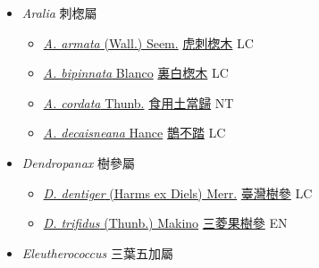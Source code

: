 
  \begin{itemize}
 \item[] \textit{Aralia} 刺楤屬
                    
  \begin{itemize}
        \item[] \href{http://www.theplantlist.org/tpl1.1/search?q=Aralia+armata}{\textit{A. armata} (Wall.) Seem.}   \href{\detokenize{http://taibnet.sinica.edu.tw/chi/taibnet_species_list.php?T2=虎刺楤木&T2_new_value=true&fr=y}}{虎刺楤木} LC
        \item[] \href{http://www.theplantlist.org/tpl1.1/search?q=Aralia+bipinnata}{\textit{A. bipinnata} Blanco}   \href{\detokenize{http://taibnet.sinica.edu.tw/chi/taibnet_species_list.php?T2=裏白楤木&T2_new_value=true&fr=y}}{裏白楤木} LC
        \item[] \href{http://www.theplantlist.org/tpl1.1/search?q=Aralia+cordata}{\textit{A. cordata} Thunb.}   \href{\detokenize{http://taibnet.sinica.edu.tw/chi/taibnet_species_list.php?T2=食用土當歸&T2_new_value=true&fr=y}}{食用土當歸} NT
        \item[] \href{http://www.theplantlist.org/tpl1.1/search?q=Aralia+decaisneana}{\textit{A. decaisneana} Hance}   \href{\detokenize{http://taibnet.sinica.edu.tw/chi/taibnet_species_list.php?T2=鵲不踏&T2_new_value=true&fr=y}}{鵲不踏} LC
  \end{itemize}
 \item[] \textit{Dendropanax} 樹參屬
                    
  \begin{itemize}
        \item[] \href{http://www.theplantlist.org/tpl1.1/search?q=Dendropanax+dentiger}{\textit{D. dentiger} (Harms ex Diels) Merr.}   \href{\detokenize{http://taibnet.sinica.edu.tw/chi/taibnet_species_list.php?T2=臺灣樹參&T2_new_value=true&fr=y}}{臺灣樹參} LC
        \item[] \href{http://www.theplantlist.org/tpl1.1/search?q=Dendropanax+trifidus}{\textit{D. trifidus} (Thunb.) Makino}   \href{\detokenize{http://taibnet.sinica.edu.tw/chi/taibnet_species_list.php?T2=三菱果樹參&T2_new_value=true&fr=y}}{三菱果樹參} EN
  \end{itemize}
 \item[] \textit{Eleutherococcus} 三葉五加屬
                    

\end{itemize}
